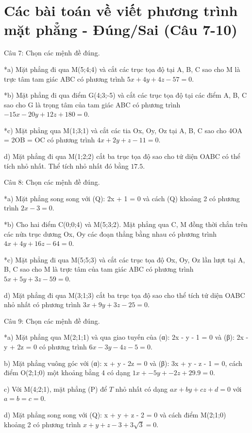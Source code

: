 \documentclass[a4paper,12pt]{article}
\begin{document}
\section*{Các bài toán về viết phương trình mặt phẳng - Đúng/Sai (Câu 7-10)}

Câu 7: Chọn các mệnh đề đúng.

*a) Mặt phẳng đi qua M(5;4;4) và cắt các trục tọa độ tại A, B, C sao cho M là trực tâm tam giác ABC có phương trình \(5x + 4y + 4z - 57 = 0\).

*b) Mặt phẳng đi qua điểm G(4;3;-5) và cắt các trục tọa độ tại các điểm A, B, C sao cho G là trọng tâm của tam giác ABC có phương trình \(-15x - 20y + 12z + 180 = 0\).

*c) Mặt phẳng qua M(1;3;1) và cắt các tia Ox, Oy, Oz tại A, B, C sao cho 4OA = 2OB = OC có phương trình \(4x + 2y + z - 11 = 0\).

d) Mặt phẳng đi qua M(1;2;2) cắt ba trục tọa độ sao cho tứ diện OABC có thể tích nhỏ nhất. Thể tích nhỏ nhất đó bằng \(17.5\).



Câu 8: Chọn các mệnh đề đúng.

*a) Mặt phẳng song song với (Q): 2x + 1 = 0 và cách (Q) khoảng 2 có phương trình \(2x - 3 = 0\).

*b) Cho hai điểm C(0;0;4) và M(5;3;2). Mặt phẳng qua C, M đồng thời chắn trên các nửa trục dương Ox, Oy các đoạn thẳng bằng nhau có phương trình \(4x + 4y + 16z - 64 = 0\).

*c) Mặt phẳng đi qua M(5;5;3) và cắt các trục tọa độ Ox, Oy, Oz lần lượt tại A, B, C sao cho M là trực tâm của tam giác ABC có phương trình \(5x + 5y + 3z - 59 = 0\).

d) Mặt phẳng đi qua M(3;1;3) cắt ba trục tọa độ sao cho thể tích tứ diện OABC nhỏ nhất có phương trình \(3x + 9y + 3z - 25 = 0\).



Câu 9: Chọn các mệnh đề đúng.

*a) Mặt phẳng qua M(2;1;1) và qua giao tuyến của (α): 2x - y - 1 = 0 và (β): 2x - y + 2z = 0 có phương trình \(6x - 3y - 4z - 5 = 0\).

b) Mặt phẳng vuông góc với (α): x + y - 2z = 0 và (β): 3x + y - z - 1 = 0, cách điểm O(2;1;0) một khoảng bằng 4 có dạng \(1x + -5y + -2z + 29.9 = 0\).

c) Với M(4;2;1), mặt phẳng (P) để \(T\) nhỏ nhất có dạng \(ax+by+cz+d=0\) với \(a=b=c=0\).

d) Mặt phẳng song song với (Q): x + y + z - 2 = 0 và cách điểm M(2;1;0) khoảng 2 có phương trình \(x + y + z - 3 + 3\sqrt{3} = 0\).
\end{document}
